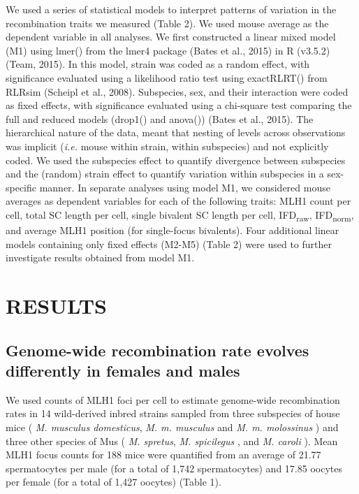 \documentclass[
]{article}
\begin{document}
We used a series of statistical models to interpret patterns of
variation in the recombination traits we measured (Table 2). We used
mouse average as the dependent variable in all analyses. We first
constructed a linear mixed model (M1) using lmer() from the lmer4
package (Bates et al., 2015) in R (v3.5.2) (Team, 2015). In this model,
strain was coded as a random effect, with significance evaluated using a
likelihood ratio test using exactRLRT() from RLRsim (Scheipl et al.,
2008). Subspecies, sex, and their interaction were coded as fixed
effects, with significance evaluated using a chi-square test comparing
the full and reduced models (drop1() and anova()) (Bates et al., 2015).
The hierarchical nature of the data, meant that nesting of levels across
observations was implicit (\emph{i.e.} mouse within strain, within
subspecies) and not explicitly coded. We used the subspecies effect to
quantify divergence between subspecies and the (random) strain effect to
quantify variation within subspecies in a sex-specific manner. In
separate analyses using model M1, we considered mouse averages as
dependent variables for each of the following traits: MLH1 count per
cell, total SC length per cell, single bivalent SC length per cell,
IFD\textsubscript{raw}, IFD\textsubscript{norm}, and average MLH1
position (for single-focus bivalents). Four additional linear models
containing only fixed effects (M2-M5) (Table 2) were used to further
investigate results obtained from model M1.

\hypertarget{results}{%
\section{RESULTS}\label{results}}

\hypertarget{genome-wide-recombination-rate-evolves-differently-in-females-and-males}{%
\subsection{Genome-wide recombination rate evolves differently in
females and
males}\label{genome-wide-recombination-rate-evolves-differently-in-females-and-males}}

We used counts of MLH1 foci per cell to estimate genome-wide
recombination rates in 14 wild-derived inbred strains sampled from three
subspecies of house mice ( \emph{M. musculus domesticus}, \emph{M. m.
musculus} and \emph{M. m. molossinus} ) and three other species of Mus (
\emph{M. spretus}, \emph{M. spicilegus} , and \emph{M. caroli} ). Mean
MLH1 focus counts for 188 mice were quantified from an average of 21.77
spermatocytes per male (for a total of 1,742 spermatocytes) and 17.85
oocytes per female (for a total of 1,427 oocytes) (Table 1).
\end{document}
